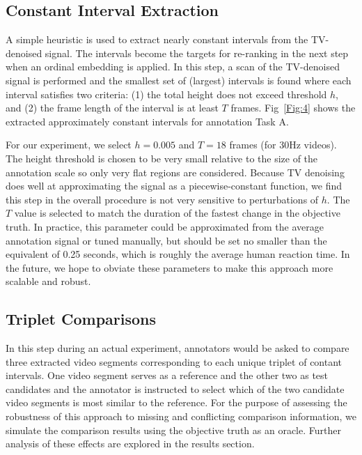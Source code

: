 \documentclass[10pt,letterpaper]{article}
\begin{document}
\subsection*{Constant Interval Extraction}
A simple heuristic is used to extract nearly constant intervals from the TV-denoised signal.  The intervals become the targets for re-ranking in the next step when an ordinal embedding is applied.  In this step, a scan of the TV-denoised signal is performed and the smallest set of (largest) intervals is found where each interval satisfies two criteria: (1) the total height does not exceed threshold $h$, and (2) the frame length of the interval is at least $T$ frames.  Fig~\ref{Fig:4} shows the extracted approximately constant intervals for annotation Task A.

For our experiment, we select $h=0.005$ and $T=18$ frames (for 30Hz videos).  The height threshold is chosen to be very small relative to the size of the annotation scale so only very flat regions are considered.  Because TV denoising does well at approximating the signal as a piecewise-constant function, we find this step in the overall procedure is not very sensitive to perturbations of $h$.  The $T$ value is selected to match the duration of the fastest change in the objective truth.  In practice, this parameter could be approximated from the average annotation signal or tuned manually, but should be set no smaller than the equivalent of 0.25 seconds, which is roughly the average human reaction time.  In the future, we hope to obviate these parameters to make this approach more scalable and robust.

\subsection*{Triplet Comparisons}
In this step during an actual experiment, annotators would be asked to compare three extracted video segments corresponding to each unique triplet of contant intervals.  One video segment serves as a reference and the other two as test candidates and the annotator is instructed to select which of the two candidate video segments is most similar to the reference.  For the purpose of assessing the robustness of this approach to missing and conflicting comparison information, we simulate the comparison results using the objective truth as an oracle.  Further analysis of these effects are explored in the results section.
\end{document}
